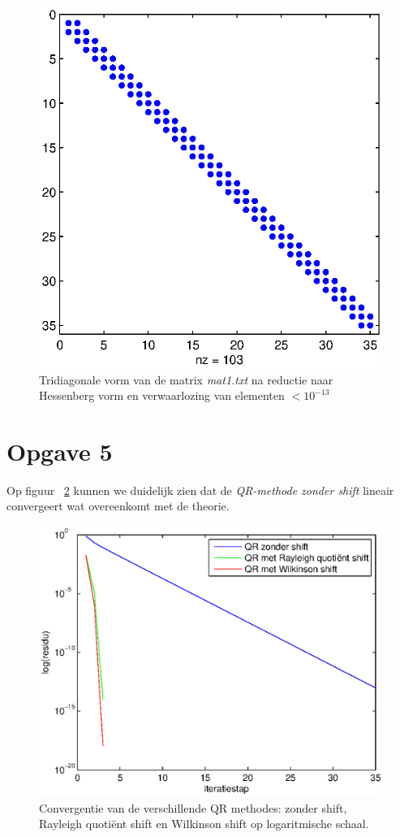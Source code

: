 \documentclass[a4paper]{article}
\newcommand{\opgave}[1]{\section*{Opgave #1}}
\begin{document}
\begin{figure}[H]
\begin{minipage}[t]{0.45\linewidth}
\centerline{\includegraphics[scale=0.45]{pictures/opgave4Hessenberg2.eps}}
\caption{Tridiagonale vorm van de matrix \textit{mat1.txt} na reductie naar Hessenberg vorm en verwaarlozing van elementen $<10^{-13}$}
\label{fig:figure2}
\end{minipage}
\end{figure}
\newpage
\opgave{5}
Op figuur ~\ref{fig:opgave5} kunnen we duidelijk zien dat de \textit{QR-methode zonder shift} lineair convergeert wat overeenkomt met de theorie.
\begin{figure}
\centerline{\includegraphics{pictures/opgave5grafiek.eps}}
\caption{Convergentie van de verschillende QR methodes: zonder shift, Rayleigh quoti\"{e}nt shift en Wilkinson shift op logaritmische schaal.}
\label{fig:opgave5}
\end{figure}
\end{document}
